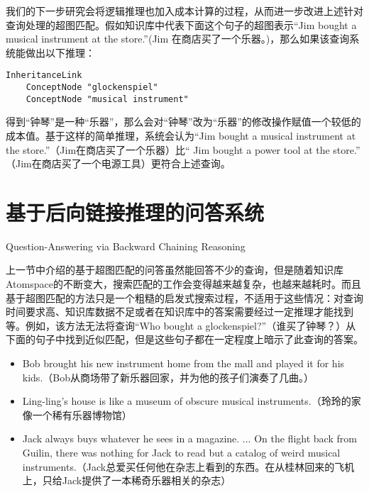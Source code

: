 {\begin{tiny}
\begin{lstlisting}
\end{lstlisting}\end{tiny}}

我们的下一步研究会将逻辑推理也加入成本计算的过程，从而进一步改进上述针对查询处理的超图匹配。假如知识库中代表下面这个句子的超图表示“Jim bought a musical instrument at the store.”(Jim 在商店买了一个乐器。)，那么如果该查询系统能做出以下推理：

\begin{verbatim}
InheritanceLink
	ConceptNode "glockenspiel"
	ConceptNode "musical instrument"
\end{verbatim}

得到“钟琴”是一种“乐器”，那么会对“钟琴”改为“乐器”的修改操作赋值一个较低的成本值。基于这样的简单推理，系统会认为“Jim bought a musical instrument at the store.”（Jim在商店买了一个乐器）比“ Jim bought a power tool at the store.” （Jim在商店买了一个电源工具）更符合上述查询。

\section{基于后向链接推理的问答系统}{Question-Answering via Backward Chaining Reasoning}
\label{sec:backward}

上一节中介绍的基于超图匹配的问答虽然能回答不少的查询，但是随着知识库Atomspace的不断变大，搜索匹配的工作会变得越来越复杂，也越来越耗时。而且基于超图匹配的方法只是一个粗糙的启发式搜索过程，不适用于这些情况：对查询时间要求高、知识库数据不足或者在知识库中的答案需要经过一定推理才能找到等。例如，该方法无法将查询“Who bought a glockenspiel?”（谁买了钟琴？）从下面的句子中找到近似匹配，但是这些句子都在一定程度上暗示了此查询的答案。

\begin{itemize}
\item Bob brought his new instrument home from the mall and played it for his kids.（Bob从商场带了新乐器回家，并为他的孩子们演奏了几曲。）
\item Ling-ling's house is like a museum of obscure musical instruments.（玲玲的家像一个稀有乐器博物馆）
\item Jack always buys whatever he sees in a magazine. ... On the flight back from Guilin, there was nothing for Jack to read but a catalog of weird musical instruments.（Jack总爱买任何他在杂志上看到的东西。在从桂林回来的飞机上，只给Jack提供了一本稀奇乐器相关的杂志）
\end{itemize}

